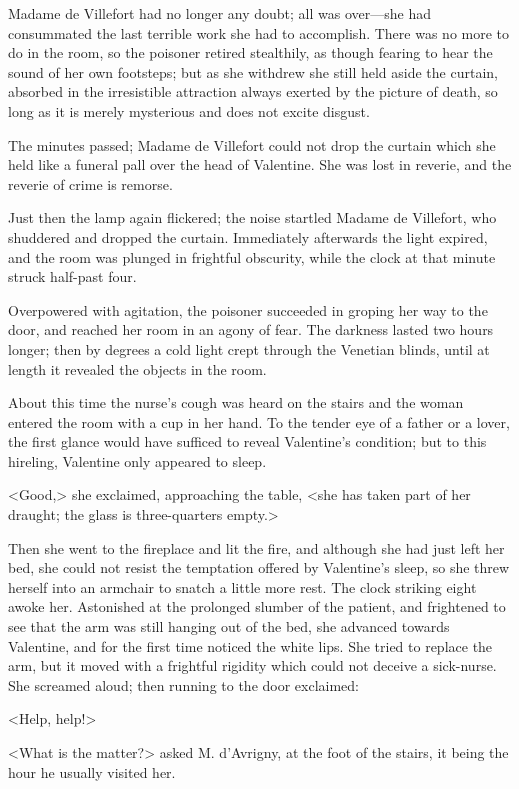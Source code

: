  Madame de Villefort had no longer any doubt; all was over—she had consummated the last terrible work she had to accomplish. There was no more to do in the room, so the poisoner retired stealthily, as though fearing to hear the sound of her own footsteps; but as she withdrew she still held aside the curtain, absorbed in the irresistible attraction always exerted by the picture of death, so long as it is merely mysterious and does not excite disgust. 

 The minutes passed; Madame de Villefort could not drop the curtain which she held like a funeral pall over the head of Valentine. She was lost in reverie, and the reverie of crime is remorse. 

 Just then the lamp again flickered; the noise startled Madame de Villefort, who shuddered and dropped the curtain. Immediately afterwards the light expired, and the room was plunged in frightful obscurity, while the clock at that minute struck half-past four. 

 Overpowered with agitation, the poisoner succeeded in groping her way to the door, and reached her room in an agony of fear. The darkness lasted two hours longer; then by degrees a cold light crept through the Venetian blinds, until at length it revealed the objects in the room. 

 About this time the nurse's cough was heard on the stairs and the woman entered the room with a cup in her hand. To the tender eye of a father or a lover, the first glance would have sufficed to reveal Valentine's condition; but to this hireling, Valentine only appeared to sleep. 

 <Good,> she exclaimed, approaching the table, <she has taken part of her draught; the glass is three-quarters empty.> 

 Then she went to the fireplace and lit the fire, and although she had just left her bed, she could not resist the temptation offered by Valentine's sleep, so she threw herself into an armchair to snatch a little more rest. The clock striking eight awoke her. Astonished at the prolonged slumber of the patient, and frightened to see that the arm was still hanging out of the bed, she advanced towards Valentine, and for the first time noticed the white lips. She tried to replace the arm, but it moved with a frightful rigidity which could not deceive a sick-nurse. She screamed aloud; then running to the door exclaimed: 

 <Help, help!>

<What is the matter?> asked M. d'Avrigny, at the foot of the stairs, it being the hour he usually visited her. 

